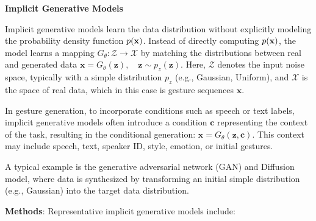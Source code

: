 \textbf{Implicit Generative Models}
\label{sec:ImplicitGenerativeModels}

Implicit generative models learn the data distribution without explicitly modeling the probability density function $p(\mathbf{x})$. Instead of directly computing $p(\mathbf{x})$, the model learns a mapping $G_{\theta}: \mathcal{Z} \to \mathcal{X}$ by matching the distributions between real and generated data $\mathbf{x} = G_\theta(\mathbf{z}), \quad \mathbf{z} \sim p_z(\mathbf{z})$. Here, $\mathcal{Z}$ denotes the input noise space, typically with a simple distribution \(p_{z}\) (e.g., Gaussian, Uniform), and \(\mathcal{X}\) is the space of real data, which in this case is gesture sequences \(\mathbf{x}\).

In gesture generation, to incorporate conditions such as speech or text labels, implicit generative models often introduce a condition $\mathbf{c}$ representing the context of the task, resulting in the conditional generation: $\mathbf{x} = G_\theta(\mathbf{z}, \mathbf{c})$. This context may include speech, text, speaker ID, style, emotion, or initial gestures.

A typical example is the generative adversarial network (GAN) and Diffusion model, where data is synthesized by transforming an initial simple distribution (e.g., Gaussian) into the target data distribution.


\textbf{Methods}: Representative implicit generative models include:

